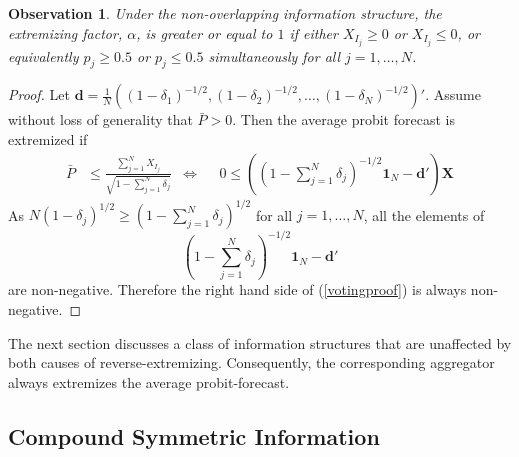 \documentclass[11pt]{article}
\newtheorem{observation}[theorem]{Observation}
\theoremstyle{definition}
\theoremstyle{definition}
\begin{document}
\begin{observation}
\label{positiveThmVote}
Under the non-overlapping information structure, the extremizing factor, $\alpha$, is greater or equal to $1$ if either $X_{I_j} \geq 0$ or  $X_{I_j} \leq 0$, or equivalently $p_j \geq 0.5$ or $p_j \leq 0.5$ simultaneously for all $j = 1, \dots, N$. 
\end{observation}
\begin{proof} 
Let $\boldsymbol{d} = \frac{1}{N}\left((1-\delta_1)^{-1/2}, (1-\delta_2)^{-1/2}, \dots, (1-\delta_N)^{-1/2}\right)'$. Assume without loss of generality that $\bar{P} > 0$. Then the average probit forecast is extremized if
\begin{align}
 \bar{P}&\leq  \frac{\sum_{j=1}^N X_{I_j}}{\sqrt{1 - \sum_{j=1}^N \delta_j}} &\Leftrightarrow&& 0 \leq  \left(  \left(1 - \sum_{j=1}^N \delta_j \right)^{-1/2} \boldsymbol{1}_N - \boldsymbol{d}' \right) \boldsymbol{X} \label{votingproof}
\end{align}
 As $N (1-\delta_j)^{1/2} \geq \left(1 - \sum_{j=1}^N \delta_j \right)^{1/2}$ for all $j = 1, \dots, N$, all the elements of $$\left(1 - \sum_{j=1}^N \delta_j \right)^{-1/2} \boldsymbol{1}_N - \boldsymbol{d}' $$ are non-negative. Therefore the right hand side of (\ref{votingproof}) is always non-negative. 
\end{proof}
The next section discusses a class of information structures that are unaffected by both causes of reverse-extremizing. Consequently, the corresponding aggregator always extremizes the average probit-forecast. 

\subsection{Compound Symmetric Information}
\label{compound}
\end{document}
